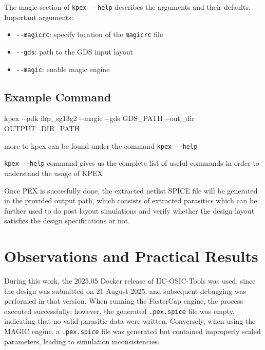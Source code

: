\documentclass[
  11pt,
  a4paper,
  oneside]{scrbook}
\newenvironment{Shaded}{}{}
\newcommand{\AttributeTok}[1]{\textcolor[rgb]{0.49,0.56,0.16}{#1}}
\newcommand{\ExtensionTok}[1]{#1}
\newcommand{\NormalTok}[1]{#1}
\providecommand{\tightlist}{%
  \setlength{\itemsep}{0pt}\setlength{\parskip}{0pt}}
\begin{document}
The magic section of \texttt{kpex\ -\/-help} describes the arguments and
their defaults. Important arguments:

\begin{itemize}
\tightlist
\item
  \texttt{-\/-magicrc}: specify location of the \texttt{magicrc} file\\
\item
  \texttt{-\/-gds}: path to the GDS input layout\\
\item
  \texttt{-\/-magic}: enable magic engine
\end{itemize}

\subsection{Example Command}\label{example-command}

\begin{Shaded}
\begin{Highlighting}[]
\ExtensionTok{kpex} \AttributeTok{{-}{-}pdk}\NormalTok{ ihp\_sg13g2 }\AttributeTok{{-}{-}magic} \AttributeTok{{-}{-}gds}\NormalTok{ GDS\_PATH }\AttributeTok{{-}{-}out\_dir}\NormalTok{ OUTPUT\_DIR\_PATH}
\end{Highlighting}
\end{Shaded}

more to kpex can be found under the command \texttt{kpex\ -\/-help}

\texttt{kpex\ -\/-help} command gives us the complete list of useful
commands in order to understand the usage of KPEX

Once PEX is succesfully done, the extracted netlist SPICE file will be
generated in the provided output path, which consists of extracted
parasitics which can be further used to do post layout simulations and
verify whether the design layout satisfies the design specifications or
not.

\section{Observations and Practical
Results}\label{observations-and-practical-results}

During this work, the 2025.05 Docker release of IIC-OSIC-Tools was used,
since the design was submitted on 21 August 2025, and subsequent
debugging was performed in that version. When running the FasterCap
engine, the process executed successfully; however, the generated
\texttt{.pex.spice} file was empty, indicating that no valid parasitic
data were written. Conversely, when using the MAGIC engine, a
\texttt{.pex.spice} file was generated but contained improperly scaled
parameters, leading to simulation inconsistencies.
\end{document}
